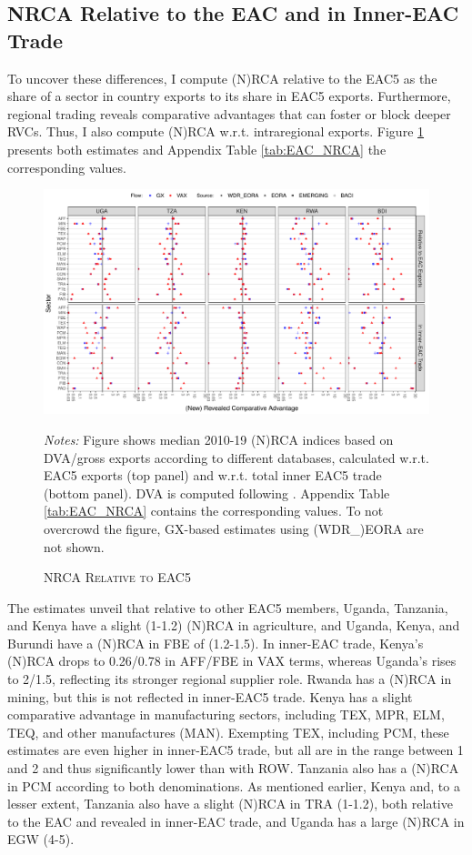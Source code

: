\documentclass[a4paper]{article}
\begin{document}
\subsection{NRCA Relative to the EAC and in Inner-EAC Trade}

To uncover these differences, I compute (N)RCA relative to the EAC5 as the share of a sector in country exports to its share in EAC5 exports. Furthermore, regional trading reveals comparative advantages that can foster or block deeper RVCs. Thus, I also compute (N)RCA w.r.t. intraregional exports. Figure \ref{fig:EAC_NRCA} presents both estimates and Appendix Table \ref{tab:EAC_NRCA} the corresponding values. 

\begin{figure}[h!]
\centering
\caption{\label{fig:EAC_NRCA}\textsc{NRCA Relative to EAC5}}
\includegraphics[width=1\textwidth]{"EAC_NRCA_EAC5_ALL.pdf"} \\
\raggedright
\scriptsize
\emph{Notes:} Figure shows median 2010-19 (N)RCA indices based on DVA/gross exports according to different databases, calculated w.r.t. EAC5 exports (top panel) and w.r.t. total inner EAC5 trade (bottom panel). DVA is computed following \citet{borin2019measuring}. Appendix Table \ref{tab:EAC_NRCA} contains the corresponding values. To not overcrowd the figure, GX-based estimates using (WDR\_)EORA are not shown.
\end{figure}
\FloatBarrier

The estimates unveil that relative to other EAC5 members, Uganda, Tanzania, and Kenya have a slight (1-1.2) (N)RCA in agriculture, and Uganda, Kenya, and Burundi have a (N)RCA in FBE of (1.2-1.5). In inner-EAC trade, Kenya's (N)RCA drops to 0.26/0.78 in AFF/FBE in VAX terms, whereas Uganda's rises to 2/1.5, reflecting its stronger regional supplier role. Rwanda has a (N)RCA in mining, but this is not reflected in inner-EAC5 trade. Kenya has a slight comparative advantage in manufacturing sectors, including TEX, MPR, ELM, TEQ, and other manufactures (MAN). Exempting TEX, including PCM, these estimates are even higher in inner-EAC5 trade, but all are in the range between 1 and 2 and thus significantly lower than with ROW. Tanzania also has a (N)RCA in PCM according to both denominations. As mentioned earlier, Kenya and, to a lesser extent, Tanzania also have a slight (N)RCA in TRA (1-1.2), both relative to the EAC and revealed in inner-EAC trade, and Uganda has a large (N)RCA in EGW (4-5). \newline
\end{document}

